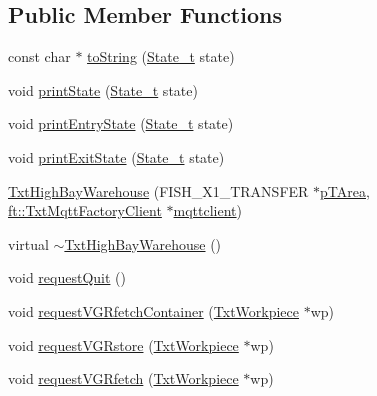 \subsection*{Public Member Functions}
\begin{DoxyCompactItemize}
\item 
const char $\ast$ \hyperlink{classft_1_1_txt_high_bay_warehouse_abeb6f6eb81f6f14ebb9040c160acc625}{to\+String} (\hyperlink{classft_1_1_txt_high_bay_warehouse_aa35f35b5549913d838cb6070bb28da30}{State\+\_\+t} state)
\item 
void \hyperlink{classft_1_1_txt_high_bay_warehouse_a82187c81e5183dae8bf563556c5e6b37}{print\+State} (\hyperlink{classft_1_1_txt_high_bay_warehouse_aa35f35b5549913d838cb6070bb28da30}{State\+\_\+t} state)
\item 
void \hyperlink{classft_1_1_txt_high_bay_warehouse_a894191eac9f7824d017008eab5e95251}{print\+Entry\+State} (\hyperlink{classft_1_1_txt_high_bay_warehouse_aa35f35b5549913d838cb6070bb28da30}{State\+\_\+t} state)
\item 
void \hyperlink{classft_1_1_txt_high_bay_warehouse_aed345d897ebc62ba2cc86d8ecc3b43e9}{print\+Exit\+State} (\hyperlink{classft_1_1_txt_high_bay_warehouse_aa35f35b5549913d838cb6070bb28da30}{State\+\_\+t} state)
\item 
\hyperlink{classft_1_1_txt_high_bay_warehouse_a126ecc2341746fce3a9a2ae75fc1a72b}{Txt\+High\+Bay\+Warehouse} (F\+I\+S\+H\+\_\+\+X1\+\_\+\+T\+R\+A\+N\+S\+F\+ER $\ast$\hyperlink{classft_1_1_txt_simulation_model_a9facd66a0dbecd676ae7b72c37a0b300}{p\+T\+Area}, \hyperlink{classft_1_1_txt_mqtt_factory_client}{ft\+::\+Txt\+Mqtt\+Factory\+Client} $\ast$\hyperlink{classft_1_1_txt_simulation_model_a6a92fdef8619b9b1636c7c464091ea3a}{mqttclient})
\item 
virtual \hyperlink{classft_1_1_txt_high_bay_warehouse_a6a91915425a003402ad626d45b84a6e8}{$\sim$\+Txt\+High\+Bay\+Warehouse} ()
\item 
void \hyperlink{classft_1_1_txt_high_bay_warehouse_a8e8deaf93270532a80c6bc40390d2275}{request\+Quit} ()
\item 
void \hyperlink{classft_1_1_txt_high_bay_warehouse_a8c85ddf8678b0589ebbd1efd5c0a6833}{request\+V\+G\+Rfetch\+Container} (\hyperlink{classft_1_1_txt_workpiece}{Txt\+Workpiece} $\ast$wp)
\item 
void \hyperlink{classft_1_1_txt_high_bay_warehouse_a1da138b9b408d9ebfa8dca1c14558f8c}{request\+V\+G\+Rstore} (\hyperlink{classft_1_1_txt_workpiece}{Txt\+Workpiece} $\ast$wp)
\item 
void \hyperlink{classft_1_1_txt_high_bay_warehouse_a986d4c61e1666039dcedee24868578d7}{request\+V\+G\+Rfetch} (\hyperlink{classft_1_1_txt_workpiece}{Txt\+Workpiece} $\ast$wp)

\end{DoxyCompactItemize}
